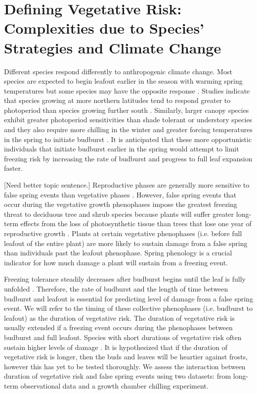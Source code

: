 \documentclass{article}\usepackage[]{graphicx}\usepackage[]{color}
\begin{document}
\section {Defining Vegetative Risk: Complexities due to Species' Strategies and Climate Change}
Different species respond differently to anthropogenic climate change. Most species are expected to begin leafout earlier in the season with warming spring temperatures but some species may have the opposite response \citep{Cleland2006, Yu2010, Xin2016}. Studies indicate that species growing at more northern latitudes tend to respond greater to photoperiod than species growing further south \citep {Partanen2004, Viheraaarnio2006, Caffarra2011}. Similarly, larger canopy species exhibit greater photoperiod sensitivities than shade tolerant or understory species \citep{Basler2012} and they also require more chilling in the winter and greater forcing temperatures in the spring to initiate budburst \citep{Laube2013}. It is anticipated that these more opportunistic individuals that initiate budburst earlier in the spring would attempt to limit freezing risk by increasing the rate of budburst and progress to full leaf expansion faster.

[Need better topic sentence.] Reproductive phases are generally more sensitive to false spring events than vegetative phases \citep{Augspurger2009, Lenz2013}. However, false spring events that occur during the vegetative growth phenophases impose the greatest freezing threat to deciduous tree and shrub species because plants will suffer greater long-term effects from the loss of photosynthetic tissue than trees that lose one year of reproductive growth \citep{Sakai1987}. Plants at certain vegetative phenophases (i.e. before full leafout of the entire plant) are more likely to sustain damage from a false spring than individuals past the leafout phenophase. Spring phenology is a crucial indicator for how much damage a plant will sustain from a freezing event.

Freezing tolerance steadily decreases after budburst begins until the leaf is fully unfolded \citep{Lenz2016}. Therefore, the rate of budburst and the length of time between budburst and leafout is essential for predicting level of damage from a false spring event. We will refer to the timing of these collective phenophases (i.e. budburst to leafout) as the duration of vegetative risk. The duration of vegetative risk is usually extended if a freezing event occurs during the phenophases between budburst and full leafout. Species with short durations of vegetative risk often sustain higher levels of damage \citep {Augspurger2009}. It is hypothesized that if the duration of vegetative risk is longer, then the buds and leaves will be heartier against frosts, however this has yet to be tested thoroughly. We assess the interaction between duration of vegetative risk and false spring events using two datasets: from long-term observational data and a growth chamber chilling experiment.
\end{document}
